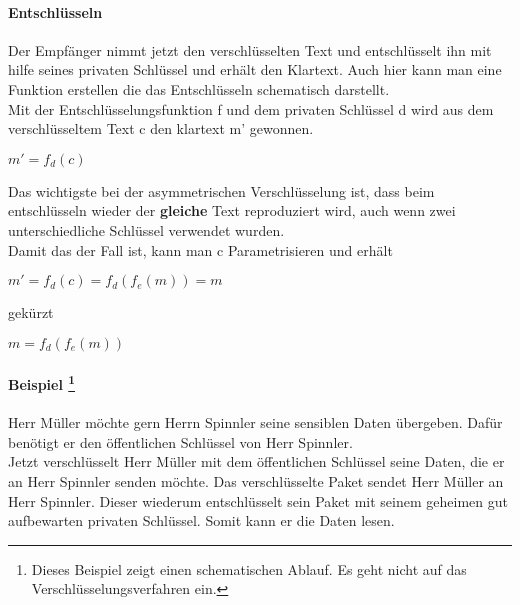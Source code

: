 \paragraph{Entschlüsseln}
Der Empfänger nimmt jetzt den verschlüsselten Text und entschlüsselt ihn mit hilfe seines privaten Schlüssel und erhält den Klartext.
Auch hier kann man eine Funktion erstellen die das Entschlüsseln schematisch darstellt.\\
Mit der Entschlüsselungsfunktion f und dem privaten Schlüssel d wird aus dem verschlüsseltem Text c den klartext m' gewonnen.
\begin{center}
$ m' = f_d (c) $
\end{center}
Das wichtigste bei der asymmetrischen Verschlüsselung ist, dass beim entschlüsseln wieder der \textbf{gleiche} Text reproduziert wird, auch wenn zwei unterschiedliche Schlüssel verwendet wurden.\\
Damit das der Fall ist, kann man c Parametrisieren und erhält
\begin{center}
$ m' = f_d (c) = f_d (f_e (m) ) = m $\\
\end{center}
gekürzt\\
\begin{center}
$ m = f_d ( f_e (m) )$
\end{center}
\paragraph{Beispiel \footnote{Dieses Beispiel zeigt einen schematischen Ablauf. Es geht nicht auf das Verschlüsselungsverfahren ein.} }
Herr Müller möchte gern Herrn Spinnler seine sensiblen Daten übergeben. Dafür benötigt er den öffentlichen Schlüssel von Herr Spinnler.\\
Jetzt verschlüsselt Herr Müller mit dem öffentlichen Schlüssel seine Daten, die er an Herr Spinnler senden möchte. Das verschlüsselte Paket sendet Herr Müller an Herr Spinnler. Dieser wiederum entschlüsselt sein Paket mit seinem geheimen gut aufbewarten privaten Schlüssel. Somit kann er die Daten lesen.

